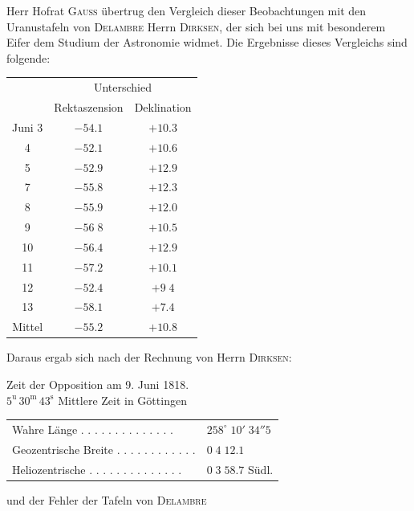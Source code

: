 \par\indent Herr Hofrat \textsc{Gauss} übertrug den Vergleich dieser Beobachtungen mit den Uranustafeln von \textsc{Delambre} Herrn \textsc{Dirksen}, der sich bei uns mit besonderem Eifer dem Studium der Astronomie widmet. Die Ergebnisse dieses Vergleichs sind folgende:

\begin{center}
\begin{tabular}{c|cc}
& \multicolumn{2}{c}{Unterschied} \\
& Rektaszension & Deklination \\
\hline
Juni 3 & $-54.1$ & $+10.3$ \\
4 & $-52.1$ & $+10.6$ \\
5 & $-52.9$ & $+12.9$ \\
7 & $-55.8$ & $+12.3$ \\
8 & $-55.9$ & $+12.0$ \\
9 & $-56\;8$ & $+10.5$ \\
10 & $-56.4$ & $+12.9$ \\
11 & $-57.2$ & $+10.1$ \\
12 & $-52.4$ & $+9\;4$ \\ 
13 & $-58.1$ & $+7.4$ \\
\hline
Mittel & $-55.2$ & $+10.8$ \\
\end{tabular}
\end{center}

\par\indent Daraus ergab sich nach der Rechnung von Herrn \textsc{Dirksen}:

\begin{center}
Zeit der Opposition am 9. Juni 1818.\\
$5^{\mathrm u}\,30^{\mathrm m}\,43^{\mathrm s}$ Mittlere Zeit in Göttingen
\end{center}
\begin{center}
\begin{tabular}{ll}
Wahre Länge . . . . . . . . . . . . . . & $258^\circ\;10'\;34''5$ \\
Geozentrische Breite . . . . . . . . . . . . & $0\;4\;12.1$ \\
Heliozentrische . . . . . . . . . . . . . . & $0\;3\;58.7$ Südl. \\
\end{tabular}
\end{center}

\noindent und der Fehler der Tafeln von \textsc{Delambre}

